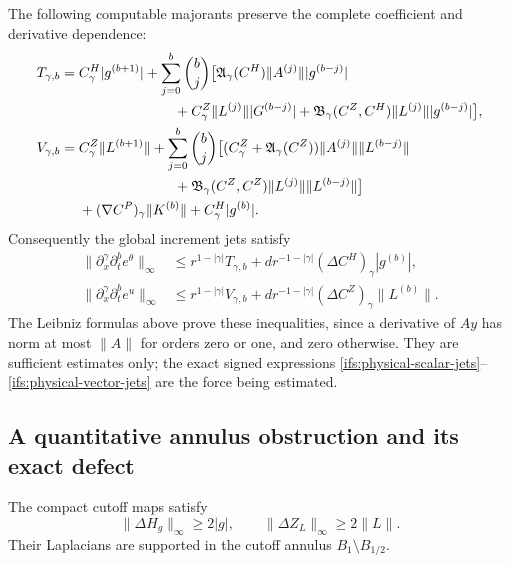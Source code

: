 The following computable majorants preserve the complete coefficient
and derivative dependence:
\begin{align}
 T_{\gamma,b}={}&C^H_\gamma|g^{(b+1)}|
  +\sum_{j=0}^b\binom bj\bigl[
    \mathfrak A_\gamma(C^H)\|A^{(j)}\||g^{(b-j)}|\nonumber\\
 &\hspace{24mm}+C^Z_\gamma\|L^{(j)}\||G^{(b-j)}|
    +\mathfrak B_\gamma(C^Z,C^H)\|L^{(j)}\||g^{(b-j)}|\bigr],
 \label{ifs:scalar-majorant}\\
 V_{\gamma,b}={}&C^Z_\gamma\|L^{(b+1)}\|
  +\sum_{j=0}^b\binom bj\bigl[
    (C^Z_\gamma+\mathfrak A_\gamma(C^Z))
                         \|A^{(j)}\|\|L^{(b-j)}\|\nonumber\\
 &\hspace{24mm}+\mathfrak B_\gamma(C^Z,C^Z)
                         \|L^{(j)}\|\|L^{(b-j)}\|\bigr]\nonumber\\
 &+(\nabla C^P)_\gamma\|K^{(b)}\|+C^H_\gamma|g^{(b)}|.
 \label{ifs:vector-majorant}
\end{align}
Consequently the global increment jets satisfy
\begin{align}
 \|\partial_x^\gamma\partial_t^b e^\theta\|_\infty
 &\leq r^{1-|\gamma|}T_{\gamma,b}
       +d r^{-1-|\gamma|}(\Delta C^H)_\gamma |g^{(b)}|,
 \nonumber\\
 \|\partial_x^\gamma\partial_t^b e^u\|_\infty
 &\leq r^{1-|\gamma|}V_{\gamma,b}
       +d r^{-1-|\gamma|}(\Delta C^Z)_\gamma \|L^{(b)}\|.
 \label{ifs:force-majorants}
\end{align}
The Leibniz formulas above prove these inequalities, since a derivative
of $Ay$ has norm at most $\|A\|$ for orders zero or one, and zero
otherwise.  They are sufficient estimates only; the exact signed
expressions \eqref{ifs:physical-scalar-jets}--\eqref{ifs:physical-vector-jets}
are the force being estimated.

\subsection{A quantitative annulus obstruction and its exact defect}

\begin{lemma}\label{ifs:cutoff-diffusion-lower-bound}
The compact cutoff maps satisfy
\[
 \|\Delta H_g\|_\infty\geq2|g|,\qquad
 \|\Delta Z_L\|_\infty\geq2\|L\|.
\]
Their Laplacians are supported in the cutoff annulus
$B_1\setminus B_{1/2}$.
\end{lemma}

